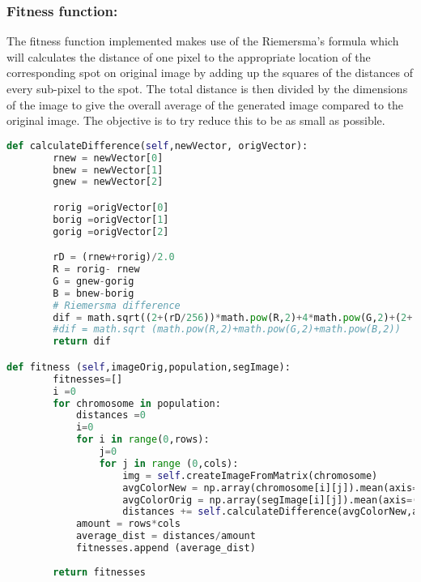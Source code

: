 \documentclass{article}
\begin{document}
\subsubsection*{Fitness function:}
The fitness function implemented makes use of the Riemersma's formula which will calculates the distance of one pixel to the appropriate location of the corresponding spot on original image by adding up the squares of the distances of every sub-pixel to the spot. The total distance is then divided by the dimensions of the image to give the overall average of the generated image compared to the original image. The objective is to try reduce this to be as small as possible. \\


\begin{lstlisting}[language=Python]
def calculateDifference(self,newVector, origVector):
        rnew = newVector[0]
        bnew = newVector[1]
        gnew = newVector[2]

        rorig =origVector[0]
        borig =origVector[1]
        gorig =origVector[2]

        rD = (rnew+rorig)/2.0
        R = rorig- rnew
        G = gnew-gorig
        B = bnew-borig
        # Riemersma difference
        dif = math.sqrt((2+(rD/256))*math.pow(R,2)+4*math.pow(G,2)+(2+((255-rD)/256))*math.pow(B,2))
        #dif = math.sqrt (math.pow(R,2)+math.pow(G,2)+math.pow(B,2))
        return dif

def fitness (self,imageOrig,population,segImage):
        fitnesses=[]
        i =0
        for chromosome in population:
            distances =0
            i=0
            for i in range(0,rows):
                j=0
                for j in range (0,cols):
                    img = self.createImageFromMatrix(chromosome)
                    avgColorNew = np.array(chromosome[i][j]).mean(axis=(0,1))
                    avgColorOrig = np.array(segImage[i][j]).mean(axis=(0,1))
                    distances += self.calculateDifference(avgColorNew,avgColorOrig)
            amount = rows*cols
            average_dist = distances/amount
            fitnesses.append (average_dist)
            
        return fitnesses
\end{lstlisting}
\end{document}
